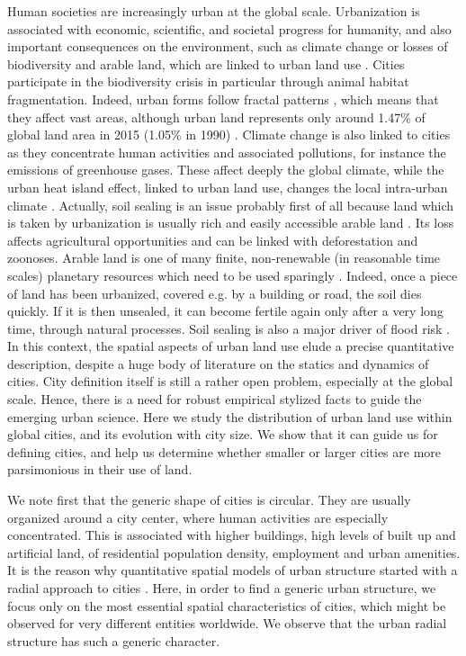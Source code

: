 \documentclass[sn-mathphys-num]{sn-jnl}%
\theoremstyle{thmstyleone}%
\theoremstyle{thmstyletwo}%
\theoremstyle{thmstylethree}%
\begin{document}
Human societies are increasingly urban at the global scale. Urbanization is associated with economic, scientific, and societal progress \cite{glaeser2012} for humanity, and also important consequences on the environment, such as climate change or losses of biodiversity and arable land, which are linked to urban land use \cite{seto2011,bren2017,mcdonald2020,simkin2022,seto2012,schwela2000,WHO2020}. Cities participate in the biodiversity crisis in particular through animal habitat fragmentation. Indeed, urban forms follow fractal patterns \cite{white1993}, which means that they affect vast areas, although urban land represents only around 1.47\% of global land area in 2015 (1.05\% in 1990) \cite{CIESIN2013}. Climate change is also linked to cities as they concentrate human activities and associated pollutions, for instance the emissions of greenhouse gases. These affect deeply the global climate, while the urban heat island effect, linked to urban land use, changes the local intra-urban climate \cite{zhou2017}. Actually, soil sealing is an issue probably first of all because land which is taken by urbanization is usually rich and easily accessible arable land \cite{bren2017}. Its loss affects agricultural opportunities and can be linked with deforestation and zoonoses. Arable land is one of many finite, non-renewable (in reasonable time scales) planetary resources which need to be used sparingly \cite{rome,iea2023}. Indeed, once a piece of land has been urbanized, covered e.g. by a building or road, the soil dies quickly. If it is then unsealed, it can become fertile again only after a very long time, through natural processes. Soil sealing is also a major driver of flood risk \cite{wheater2009}.
In this context, the spatial aspects of urban land use elude a precise quantitative description, despite a huge body of literature on the statics and dynamics of cities. City definition itself is still a rather open problem, especially at the global scale. Hence, there is a need for robust empirical stylized facts to guide the emerging urban science. Here we study the distribution of urban land use within global cities, and its evolution with city size. We show that it can guide us for defining cities, and help us determine whether smaller or larger cities are more parsimonious in their use of land. 


We note first that the generic shape of cities is circular. They are usually organized around a city center, where human activities are especially concentrated. This is associated with higher buildings, high levels of built up and artificial land, of residential population density, employment and urban amenities. It is the reason why quantitative spatial models of urban structure started with a radial approach to cities \cite{vonthunen,alonso}. Here, in order to find a generic urban structure, we focus only on the most essential spatial characteristics of cities, which might be observed for very different entities worldwide. We observe that the urban radial structure has such a generic character.
\end{document}
